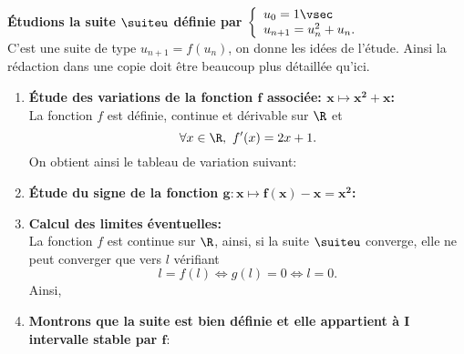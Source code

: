 \begin{correction}
\textbf{\'Etudions la suite $\mathbf{\suiteu}$ d\'efinie par $\mathbf{\left\lbrace\begin{array}{l}
u_0=1\vsec\\
u_{n+1}=u_n^2+u_n.
\end{array}\right.}$}\\
\noindent C'est une suite de type $u_{n+1}=f(u_n)$, on donne les id\'ees de l'\'etude. Ainsi la r\'edaction dans une copie doit \^{e}tre beaucoup plus d\'etaill\'ee qu'ici.
\begin{enumerate}
 \item \textbf{\'Etude des variations de la fonction $\mathbf{f}$ associ\'ee: $\mathbf{x\mapsto x^2+x}$:}\\
\noindent La fonction $f$ est d\'efinie, continue et d\'erivable sur $\R$ et 
$$\forall x\in\R,\ f^{\prime}(x)=2x+1.$$
On obtient ainsi le tableau de variation suivant:
\begin{center}
\end{center}
\item \textbf{\'Etude du signe de la fonction $\mathbf{g: x\mapsto f(x)-x=x^2}$:}\\
\noindent {}
\item \textbf{Calcul des limites \'eventuelles:}\\
\noindent La fonction $f$ est continue sur $\R$, ainsi, si la suite $\suiteu$ converge, elle ne peut converger que vers $l$ v\'erifiant 
$$l=f(l)\Leftrightarrow g(l)=0\Leftrightarrow l=0.$$
Ainsi, 
\item \textbf{Montrons que la suite est bien d\'efinie et elle appartient \`{a} $\mathbf{I}$ intervalle stable par $\mathbf{f}$}:\\

\end{enumerate}
\end{correction}
